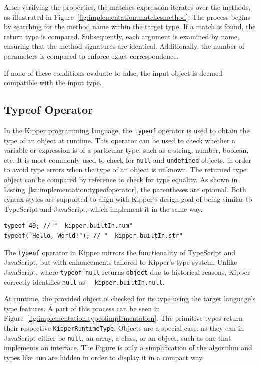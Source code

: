 After verifying the properties, the matches expression iterates over the methods, as illustrated in Figure~\ref{fig:implementation:matchesmethod}. The process begins by searching for the method name within the target type. If a match is found, the return type is compared. Subsequently, each argument is examined by name, ensuring that the method signatures are identical. Additionally, the number of parameters is compared to enforce exact correspondence.

If none of these conditions evaluate to false, the input object is deemed compatible with the input type.

\subsection{Typeof Operator}
\label{sec:typeof}

In the Kipper programming language, the \lstinline|typeof| operator is used to obtain the type of an object at runtime. This operator can be used to check whether a variable or expression is of a particular type, such as a string, number, boolean, etc. It is most commonly used to check for \lstinline|null| and \lstinline|undefined| objects, in order to avoid type errors when the type of an object is unknown. The returned type object can be compared by reference to check for type equality. As shown in Listing~\ref{lst:implementation:typeofoperator}, the parentheses are optional. Both syntax styles are supported to align with Kipper's design goal of being similar to TypeScript and JavaScript, which implement it in the same way.

\begin{lstlisting}[language=Kipper,caption=Typeof operator used to determine the type of an input expression,label=lst:implementation:typeofoperator]
typeof 49; // "__kipper.builtIn.num"
typeof("Hello, World!"); // "__kipper.builtIn.str"
\end{lstlisting}

The \lstinline|typeof| operator in Kipper mirrors the functionality of TypeScript and JavaScript, but with enhancements tailored to Kipper's type system. Unlike JavaScript, where \lstinline|typeof null| returns \lstinline|object| due to historical reasons, Kipper correctly identifies \lstinline|null| as \lstinline|__kipper.builtIn.null|.

At runtime, the provided object is checked for its type using the target language's type features. A part of this process can be seen in Figure~\ref{fig:implementation:typeofimplementation}. The primitive types return their respective \lstinline|KipperRuntimeType|. Objects are a special case, as they can in JavaScript either be \lstinline|null|, an array, a class, or an object, such as one that implements an interface. The Figure is only a simplification of the algorithm and types like \lstinline|num| are hidden in order to display it in a compact way.

